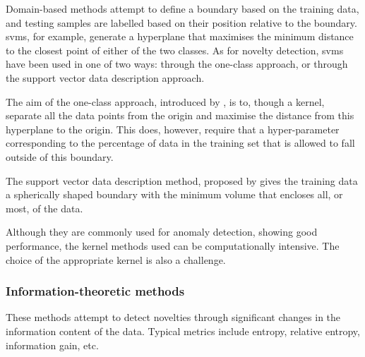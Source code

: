 Domain-based methods attempt to define a boundary based on the training data, and testing samples are labelled based on their position relative to the boundary. \glspl{svm}, for example, generate a hyperplane that maximises the minimum distance to the closest point of either of the two classes. As for novelty detection, \glspl{svm} have been used in one of two ways: through the one-class approach, or through the support vector data description approach.\par
The aim of the one-class approach, introduced by \cite{scholkopf1999}, is to, though a kernel, separate all the data points from the origin and maximise the distance from this hyperplane to the origin. This does, however, require that a hyper-parameter corresponding to the percentage of data in the training set that is allowed to fall outside of this boundary.\par
The support vector data description method, proposed by \cite{tax2004} gives the training data a spherically shaped boundary with the minimum volume that encloses all, or most, of the data.\par
Although they are commonly used for anomaly detection, showing good performance, the kernel methods used can be computationally intensive. The choice of the appropriate kernel is also a challenge.

\subsubsection{Information-theoretic methods}

These methods attempt to detect novelties through significant changes in the information content of the data. Typical metrics include entropy, relative entropy, information gain, etc.